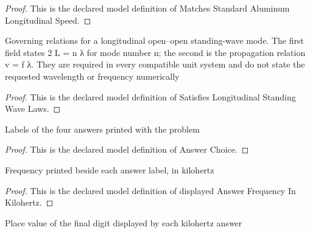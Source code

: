 \begin{proof}
  This is the declared model definition of Matches Standard Aluminum Longitudinal Speed.
\end{proof}
\begin{definition}
  \label{def:physics:phyx-mini-0185:phyxminiproblems-problemphyxmini0185-satisfieslongitudinalstandingwavelaws}
  Governing relations for a longitudinal open--open standing-wave mode. The first field states 2 L = n λ for mode number n; the second is the propagation relation v = f λ. They are required in every compatible unit system and do not state the requested wavelength or frequency numerically
\end{definition}
\begin{proof}
  This is the declared model definition of Satisfies Longitudinal Standing Wave Laws.
\end{proof}
\begin{definition}
  \label{def:physics:phyx-mini-0185:phyxminiproblems-problemphyxmini0185-answerchoice}
  Labels of the four answers printed with the problem
\end{definition}
\begin{proof}
  This is the declared model definition of Answer Choice.
\end{proof}
\begin{definition}
  \label{def:physics:phyx-mini-0185:phyxminiproblems-problemphyxmini0185-displayedanswerfrequencyinkilohertz}
  Frequency printed beside each answer label, in kilohertz
\end{definition}
\begin{proof}
  This is the declared model definition of displayed Answer Frequency In Kilohertz.
\end{proof}
\begin{definition}
  \label{def:physics:phyx-mini-0185:phyxminiproblems-problemphyxmini0185-displayedprecisioninkilohertz}
  Place value of the final digit displayed by each kilohertz answer
\end{definition}
